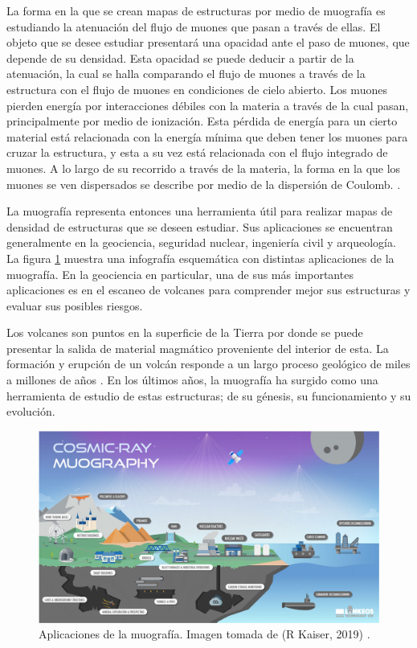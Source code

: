\documentclass[12pt]{report}
\begin{document}
La forma en la que se crean mapas de estructuras por medio de muografía es estudiando la atenuación del flujo de muones que pasan a través de ellas. El objeto que se desee estudiar presentará una opacidad ante el paso de muones, que depende de su densidad. Esta opacidad se puede deducir a partir de la atenuación, la cual se halla comparando el flujo de muones a través de la estructura con el flujo de muones en condiciones de cielo abierto. Los muones pierden energía por interacciones débiles con la materia a través de la cual pasan, principalmente por medio de ionización. Esta pérdida de energía para un cierto material está relacionada con la energía mínima que deben tener los muones para cruzar la estructura, y esta a su vez está relacionada con el flujo integrado de muones. A lo largo de su recorrido a través de la materia, la forma en la que los muones se ven dispersados se describe por medio de la dispersión de Coulomb. \cite{lesparre2010geophysical}.

La muografía representa entonces una herramienta útil para realizar mapas de densidad de estructuras que se deseen estudiar. Sus aplicaciones se encuentran generalmente en la geociencia, seguridad nuclear, ingeniería civil y arqueología. La figura \ref{fig:applications} muestra una infografía esquemática con distintas aplicaciones de la muografía. En la geociencia en particular, una de sus más importantes aplicaciones es en el escaneo de volcanes para comprender mejor sus estructuras y evaluar sus posibles riesgos.

Los volcanes son puntos en la superficie de la Tierra por donde se puede presentar la salida de material magmático proveniente del interior de esta. La formación y erupción de un volcán responde a un largo proceso geológico de miles a millones de años \cite{vesga2018inversion}. En los últimos años, la muografía ha surgido como una herramienta de estudio de estas estructuras; de su génesis, su funcionamiento y su evolución.

\begin{figure}
    \centering
    \includegraphics[width=\textwidth]{images/applications.png}
    \caption{Aplicaciones de la muografía. Imagen tomada de (R Kaiser, 2019) \cite{kaiser2019muography}.}
    \label{fig:applications}
\end{figure}
\end{document}
